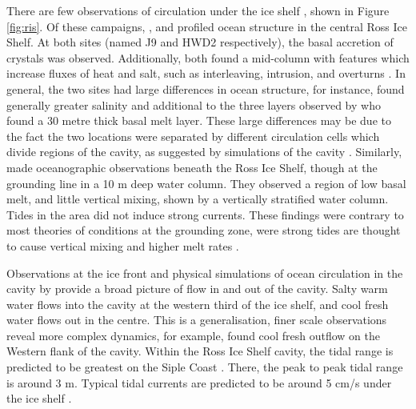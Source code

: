 There are few observations of circulation under the ice shelf \citep[e.g.][]{jacobs1979circulation,stewart2018ice,stevens2020ocean,robinson2020ice}, shown in Figure \ref{fig:ris}.
Of these campaigns, \cite{jacobs1979circulation}, \cite{foster1983temperature} and \cite{stevens2020ocean} profiled ocean structure in the central Ross Ice Shelf. At both sites (named J9 and HWD2 respectively), the basal accretion of crystals was observed. Additionally, both found a mid-column with features which increase fluxes of heat and salt, such as interleaving, intrusion, and overturns  \citep{stevens2020ocean}. In general, the two sites had large differences in ocean structure, for instance, \cite{stevens2020ocean} found generally greater salinity and additional to the three layers observed by \cite{jacobs1979circulation} who found a 30 metre thick basal melt layer. These large differences may be due to the fact the two locations were separated by different circulation cells which divide regions of the cavity, as suggested by simulations of the cavity \citep{pritchard2012antarctic}.
Similarly, \cite{begeman2018ocean} made oceanographic observations beneath the Ross Ice Shelf, though at the grounding line in a 10 m deep water column. They observed a region of low basal melt, and little vertical mixing, shown by a vertically stratified water column. Tides in the area did not induce strong currents. These findings were contrary to most theories of conditions at the grounding zone, were strong tides are thought to cause vertical mixing and higher melt rates \citep[e.g.][]{macayeal1984thermohaline}.

Observations at the ice front \citep[e.g.][]{smethie2005circulation} and physical simulations of ocean circulation in the cavity by \cite{holland2003ice} provide a broad picture of flow in and out of the cavity. Salty warm water flows into the cavity at the western third of the ice shelf, and cool fresh water flows out in the centre. This is a generalisation, finer scale observations reveal more complex dynamics, for example, \cite{robinson2014evolution} found cool fresh outflow on the Western flank of the cavity. 
Within the Ross Ice Shelf cavity, the tidal range is predicted to be greatest on the Siple Coast \citep{padman2003tides}. There, the peak to peak tidal range is around 3 m. Typical tidal currents are predicted to be around 5 cm/s under the ice shelf \citep{padman2003tides}.


